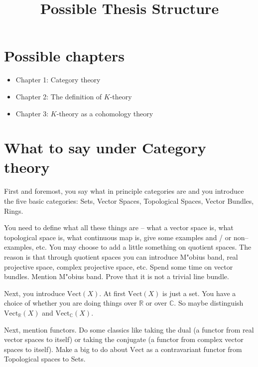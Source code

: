 \documentclass[11pt]{amsart}
\newcommand{\<}{\langle}
\renewcommand{\>}{\rangle}
\newcommand{\R}{\mathbb{R}}
\newcommand{\C}{\mathbb{C}}
\begin{document}
\title{Possible Thesis Structure}

%

\date{}

\keywords{}

\maketitle

\section{Possible chapters}

\begin{itemize}
\item Chapter 1: Category theory
\medbreak
\item Chapter 2: The definition of $K$-theory
\medbreak
\item Chapter 3: $K$-theory as a cohomology theory
\end{itemize}

\section{What to say under Category theory}

First and foremost, you say what in principle categories are and you introduce the five basic categories: Sets, Vector Spaces, Topological Spaces, Vector Bundles, Rings. 

You need to define what all these things are -- what a vector space is, what topological space is, what continuous map is, give some examples and / or non--examples, etc. You may choose to add a little something on quotient spaces. The reason is that through quotient spaces you can introduce M"obius band, real projective space, complex projective space, etc. Spend some time on vector bundles. Mention M"obius band. Prove that it is not a trivial line bundle.  

Next, you introduce $\mathrm{Vect}(X)$. At first $\mathrm{Vect}(X)$ is just a set. You have a choice of whether you are doing things over $\R$ or over $\C$. So maybe distinguish $\mathrm{Vect}_{\mathbb{R}}(X)$ and $\mathrm{Vect}_{\mathbb{C}}(X)$.

Next, mention functors. Do some classics like taking the dual (a functor from real vector spaces to itself) or taking the conjugate (a functor from complex vector spaces to itself). Make a big to do about $\mathrm{Vect}$ as a contravariant functor from Topological spaces to Sets.
\end{document}
